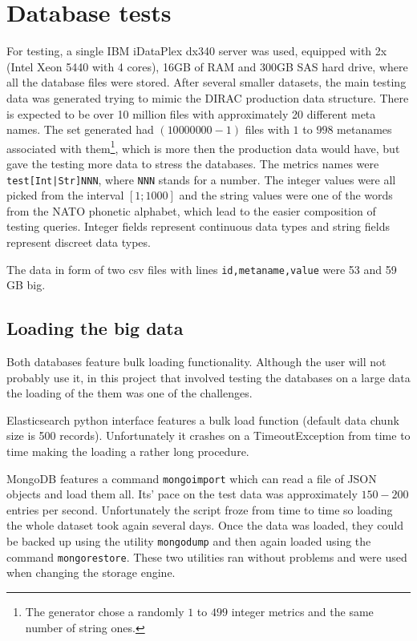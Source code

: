 
\section{Database tests}

For testing, a single IBM iDataPlex dx340 server was used, equipped with 2x (Intel Xeon 5440 with 4 cores), 16GB
of RAM and 300GB SAS hard drive, where all the database files were stored. After several smaller datasets, 
the main testing data was generated trying to mimic the DIRAC production data structure. There is expected to
be over 10 million files with approximately 20 different meta names.
The set generated had $(10 000 000 - 1)$ files with $1$ to $998$ metanames associated with them\footnote{ 
The generator chose a randomly $1$ to $499$ integer metrics and the same number of string ones.}, which is more
then the production data would have, but gave the testing more data to stress the databases.
The metrics names were \texttt{test[Int|Str]NNN}, where \texttt{NNN} stands for a number. The
integer values were all picked from the interval $[1;1000]$ and the string values were one of the
words from the NATO phonetic alphabet\cite{NATO}, which lead to the easier composition of testing queries. 
Integer fields represent continuous data types and string fields represent discreet data types.

The data in form of two csv files with lines \texttt{id,metaname,value} were 53 and 59 GB big.

\subsection{Loading the big data}

Both databases feature bulk loading functionality. Although the user will not probably use it, in
this project that involved testing the databases on a large data the loading of the them was one 
of the challenges.

Elasticsearch python interface features a bulk load function (default data chunk size is 500 records). 
Unfortunately it crashes on a TimeoutException from time to time making the loading a rather long procedure. 

MongoDB features a command \texttt{mongoimport} which can read a file of JSON objects and load
them all. Its' pace on the test data was approximately $150-200$ entries per second. Unfortunately 
the script froze from time to time so loading the whole dataset took again several days. Once the data was
loaded, they could be backed up using the utility \texttt{mongodump} and then again loaded using the 
command \texttt{mongorestore}. These two utilities ran without problems and were used when changing the 
storage engine.

